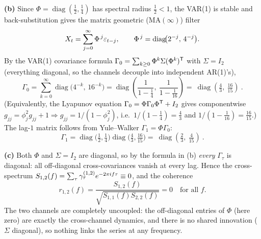 \documentclass[11pt]{article}
\DeclareMathOperator{\diag}{diag}
\begin{document}
\textbf{(b)} Since $\Phi=\diag(\tfrac12,\tfrac14)$ has spectral radius $\tfrac12<1$, the VAR(1) is stable and back-substitution gives the matrix geometric ($\mathrm{MA}(\infty)$) filter
\[
X_t=\sum_{j=0}^{\infty}\Phi^{\,j}\eps_{t-j},
\qquad
\Phi^{\,j}=\diag\!\bigl(2^{-j},\,4^{-j}\bigr).
\]
By the VAR(1) covariance formula $\Gamma_0=\sum_{k\ge0}\Phi^k\Sigma(\Phi^k)^{\mathsf{T}}$ with $\Sigma=I_2$ (everything diagonal, so the channels decouple into independent AR(1)'s),
\[
\Gamma_0=\sum_{k=0}^{\infty}\diag\!\bigl(4^{-k},\,16^{-k}\bigr)
=\diag\!\left(\frac{1}{1-\tfrac14},\ \frac{1}{1-\tfrac{1}{16}}\right)
=\boxed{\ \diag\!\left(\tfrac43,\ \tfrac{16}{15}\right)\ }.
\]
(Equivalently, the Lyapunov equation $\Gamma_0=\Phi\Gamma_0\Phi^{\mathsf{T}}+I_2$ gives componentwise $g_{jj}=\phi_j^2 g_{jj}+1\Rightarrow g_{jj}=1/(1-\phi_j^2)$, i.e.\ $1/(1-\tfrac14)=\tfrac43$ and $1/(1-\tfrac{1}{16})=\tfrac{16}{15}$.) The lag-$1$ matrix follows from Yule--Walker $\Gamma_1=\Phi\Gamma_0$:
\[
\Gamma_1=\diag\!\bigl(\tfrac12,\tfrac14\bigr)\diag\!\bigl(\tfrac43,\tfrac{16}{15}\bigr)
=\boxed{\ \diag\!\left(\tfrac23,\ \tfrac{4}{15}\right)\ }.
\]

\textbf{(c)} Both $\Phi$ and $\Sigma=I_2$ are diagonal, so by the formula in (b) \emph{every} $\Gamma_\tau$ is diagonal: all off-diagonal cross-covariances vanish at every lag. Hence the cross-spectrum $S_{1,2}(f)=\sum_\tau\gamma_\tau^{(1,2)}e^{-2\pi if\tau}\equiv0$, and the coherence
\[
r_{1,2}(f)=\frac{S_{1,2}(f)}{\sqrt{S_{1,1}(f)S_{2,2}(f)}}=0\quad\text{for all }f .
\]
The two channels are completely uncoupled: the off-diagonal entries of $\Phi$ (here zero) are exactly the cross-channel dynamics, and there is no shared innovation ($\Sigma$ diagonal), so nothing links the series at any frequency.
\end{document}
